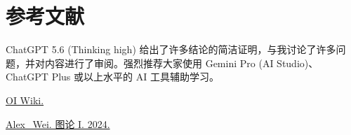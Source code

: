 \chapter*{参考文献}


    ChatGPT 5.6 (Thinking high) 给出了许多结论的简洁证明，与我讨论了许多问题，并对内容进行了审阅。强烈推荐大家使用 Gemini Pro (AI Studio)、ChatGPT Plus 或以上水平的 AI 工具辅助学习。

    \href{http://oiwiki.com}{OI Wiki.}

    \href{https://www.cnblogs.com/alex-wei/p/basic_graph_theory.html}{Alex\_Wei. 图论 I. 2024.}

  
    